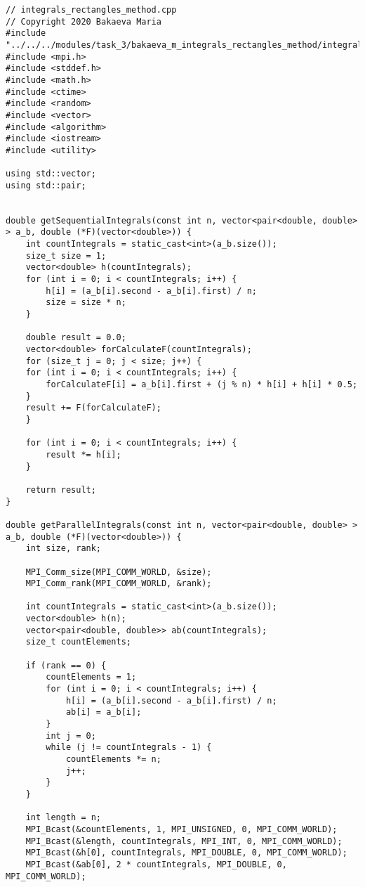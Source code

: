 \documentclass{report}
\begin{document}
\begin{lstlisting}
// integrals_rectangles_method.cpp
// Copyright 2020 Bakaeva Maria
#include "../../../modules/task_3/bakaeva_m_integrals_rectangles_method/integrals_rectangles_method.h"
#include <mpi.h>
#include <stddef.h>
#include <math.h>
#include <ctime>
#include <random>
#include <vector>
#include <algorithm>
#include <iostream>
#include <utility>

using std::vector;
using std::pair;


double getSequentialIntegrals(const int n, vector<pair<double, double> > a_b, double (*F)(vector<double>)) {
    int countIntegrals = static_cast<int>(a_b.size());
    size_t size = 1;
    vector<double> h(countIntegrals);
    for (int i = 0; i < countIntegrals; i++) {
        h[i] = (a_b[i].second - a_b[i].first) / n;
        size = size * n;
    }

    double result = 0.0;
    vector<double> forCalculateF(countIntegrals);
    for (size_t j = 0; j < size; j++) {
    for (int i = 0; i < countIntegrals; i++) {
        forCalculateF[i] = a_b[i].first + (j % n) * h[i] + h[i] * 0.5;
    }
    result += F(forCalculateF);
    }

    for (int i = 0; i < countIntegrals; i++) {
        result *= h[i];
    }

    return result;
}

double getParallelIntegrals(const int n, vector<pair<double, double> > a_b, double (*F)(vector<double>)) {
    int size, rank;

    MPI_Comm_size(MPI_COMM_WORLD, &size);
    MPI_Comm_rank(MPI_COMM_WORLD, &rank);

    int countIntegrals = static_cast<int>(a_b.size());
    vector<double> h(n);
    vector<pair<double, double>> ab(countIntegrals);
    size_t countElements; 

    if (rank == 0) {
        countElements = 1;
        for (int i = 0; i < countIntegrals; i++) {
            h[i] = (a_b[i].second - a_b[i].first) / n;
            ab[i] = a_b[i];
        }
        int j = 0;
        while (j != countIntegrals - 1) {
            countElements *= n;
            j++;
        }
    }

    int length = n;  
    MPI_Bcast(&countElements, 1, MPI_UNSIGNED, 0, MPI_COMM_WORLD);
    MPI_Bcast(&length, countIntegrals, MPI_INT, 0, MPI_COMM_WORLD);
    MPI_Bcast(&h[0], countIntegrals, MPI_DOUBLE, 0, MPI_COMM_WORLD);
    MPI_Bcast(&ab[0], 2 * countIntegrals, MPI_DOUBLE, 0, MPI_COMM_WORLD);


\end{lstlisting}
\end{document}
